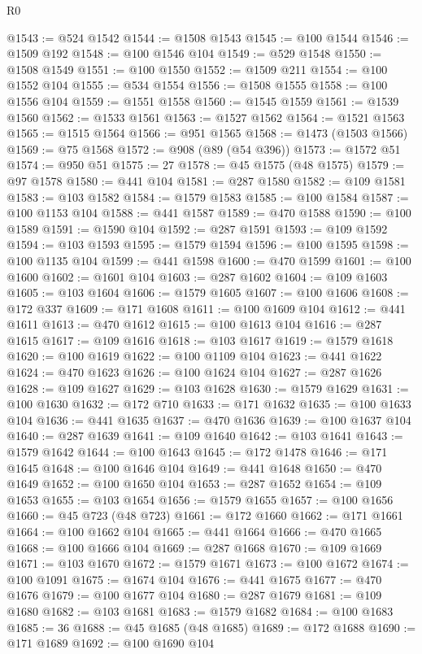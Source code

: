 \begin{lexlean}{R0}
\begin{coremodule}
@1543 := @524 @1542
@1544 := @1508 @1543
@1545 := @100 @1544
@1546 := @1509 @192
@1548 := @100 @1546 @104
@1549 := @529 @1548
@1550 := @1508 @1549
@1551 := @100 @1550
@1552 := @1509 @211
@1554 := @100 @1552 @104
@1555 := @534 @1554
@1556 := @1508 @1555
@1558 := @100 @1556 @104
@1559 := @1551 @1558
@1560 := @1545 @1559
@1561 := @1539 @1560
@1562 := @1533 @1561
@1563 := @1527 @1562
@1564 := @1521 @1563
@1565 := @1515 @1564
@1566 := @951 @1565
@1568 := @1473 (@1503 @1566)
@1569 := @75 @1568
@1572 := @908 (@89 (@54 @396))
@1573 := @1572 @51
@1574 := @950 @51
@1575 := 27
@1578 := @45 @1575 (@48 @1575)
@1579 := @97 @1578
@1580 := @441 @104
@1581 := @287 @1580
@1582 := @109 @1581
@1583 := @103 @1582
@1584 := @1579 @1583
@1585 := @100 @1584
@1587 := @100 @1153 @104
@1588 := @441 @1587
@1589 := @470 @1588
@1590 := @100 @1589
@1591 := @1590 @104
@1592 := @287 @1591
@1593 := @109 @1592
@1594 := @103 @1593
@1595 := @1579 @1594
@1596 := @100 @1595
@1598 := @100 @1135 @104
@1599 := @441 @1598
@1600 := @470 @1599
@1601 := @100 @1600
@1602 := @1601 @104
@1603 := @287 @1602
@1604 := @109 @1603
@1605 := @103 @1604
@1606 := @1579 @1605
@1607 := @100 @1606
@1608 := @172 @337
@1609 := @171 @1608
@1611 := @100 @1609 @104
@1612 := @441 @1611
@1613 := @470 @1612
@1615 := @100 @1613 @104
@1616 := @287 @1615
@1617 := @109 @1616
@1618 := @103 @1617
@1619 := @1579 @1618
@1620 := @100 @1619
@1622 := @100 @1109 @104
@1623 := @441 @1622
@1624 := @470 @1623
@1626 := @100 @1624 @104
@1627 := @287 @1626
@1628 := @109 @1627
@1629 := @103 @1628
@1630 := @1579 @1629
@1631 := @100 @1630
@1632 := @172 @710
@1633 := @171 @1632
@1635 := @100 @1633 @104
@1636 := @441 @1635
@1637 := @470 @1636
@1639 := @100 @1637 @104
@1640 := @287 @1639
@1641 := @109 @1640
@1642 := @103 @1641
@1643 := @1579 @1642
@1644 := @100 @1643
@1645 := @172 @1478
@1646 := @171 @1645
@1648 := @100 @1646 @104
@1649 := @441 @1648
@1650 := @470 @1649
@1652 := @100 @1650 @104
@1653 := @287 @1652
@1654 := @109 @1653
@1655 := @103 @1654
@1656 := @1579 @1655
@1657 := @100 @1656
@1660 := @45 @723 (@48 @723)
@1661 := @172 @1660
@1662 := @171 @1661
@1664 := @100 @1662 @104
@1665 := @441 @1664
@1666 := @470 @1665
@1668 := @100 @1666 @104
@1669 := @287 @1668
@1670 := @109 @1669
@1671 := @103 @1670
@1672 := @1579 @1671
@1673 := @100 @1672
@1674 := @100 @1091
@1675 := @1674 @104
@1676 := @441 @1675
@1677 := @470 @1676
@1679 := @100 @1677 @104
@1680 := @287 @1679
@1681 := @109 @1680
@1682 := @103 @1681
@1683 := @1579 @1682
@1684 := @100 @1683
@1685 := 36
@1688 := @45 @1685 (@48 @1685)
@1689 := @172 @1688
@1690 := @171 @1689
@1692 := @100 @1690 @104

\end{coremodule}
\end{lexlean}
